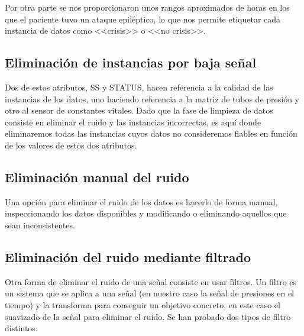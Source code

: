 Por otra parte se nos proporcionaron unos rangos aproximados de horas en los que el paciente tuvo un ataque epiléptico, lo que nos permite etiquetar cada instancia de datos como <<crisis>> o <<no crisis>>.  

\subsection{Eliminación de instancias por baja señal}

Dos de estos atributos, SS y STATUS, hacen referencia a la calidad de las instancias de los datos, uno haciendo referencia a la matriz de tubos de presión y otro al sensor de constantes vitales. Dado que la fase de limpieza de datos consiste en eliminar el ruido y las instancias incorrectas, es aquí donde eliminaremos todas las instancias cuyos datos no consideremos fiables en función de los valores de estos dos atributos. 

\subsection{Eliminación manual del ruido}

Una opción para eliminar el ruido de los datos es hacerlo de forma manual, inspeccionando los datos disponibles y modificando o eliminando aquellos que sean inconsistentes.  

\subsection{Eliminación del ruido mediante filtrado}

Otra forma de eliminar el ruido de una señal consiste en usar filtros. Un filtro es un sistema que se aplica a una señal (en nuestro caso la señal de presiones en el tiempo) y la transforma para conseguir un objetivo concreto, en este caso el suavizado de la señal para eliminar el ruido. Se han probado dos tipos de filtro distintos: 

